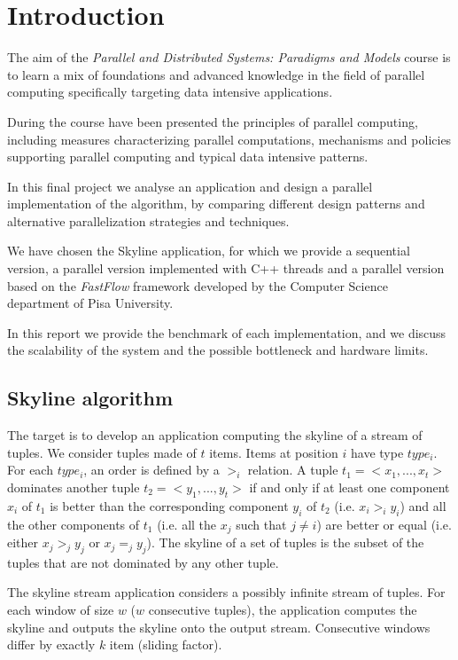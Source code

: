 \section{Introduction}
The aim of the \textit{Parallel and Distributed Systems: Paradigms and Models} course is to learn a mix of foundations and advanced knowledge in the field of parallel computing specifically targeting data intensive applications. 

During the course have been presented the principles of parallel computing, including measures characterizing parallel computations, mechanisms and policies supporting parallel computing and typical data intensive patterns.

In this final project we analyse an application and design a parallel implementation of the algorithm, by comparing different design patterns and alternative parallelization strategies and techniques.

We have chosen the Skyline application, for which we provide a sequential version, a parallel version implemented with C++ threads and a parallel version based on the \textit{FastFlow} framework developed by the Computer Science department of Pisa University.

In this report we provide the benchmark of each implementation, and we discuss the scalability of the system and the possible bottleneck and hardware limits.

\subsection{Skyline algorithm}
The target is to develop an application computing the skyline of a stream of tuples. We consider tuples made of $t$ items. Items at position $i$ have type $type_i$. For each $type_i$, an order is defined by a $>_i$ relation. A tuple $t_1 = <x_1, ... , x_t>$ dominates another tuple $t_2 = <y_1, ... , y_t>$ if and only if at least one component $x_i$ of $t_1$ is better than the corresponding component $y_i$ of $t_2$ (i.e. $x_i >_i y_i$) and all the other components of $t_1$ (i.e. all the $x_j$ such that $j \neq i$) are better or equal (i.e. either $x_j >_j y_j$ or $x_j =_j y_j$). The skyline of a set of tuples is the subset of the tuples that are not dominated by any other tuple.

The skyline stream application considers a possibly infinite stream of tuples. For each window of size $w$ ($w$ consecutive tuples), the application computes the skyline and outputs the skyline onto the output stream. Consecutive windows differ by exactly $k$ item (sliding factor).

